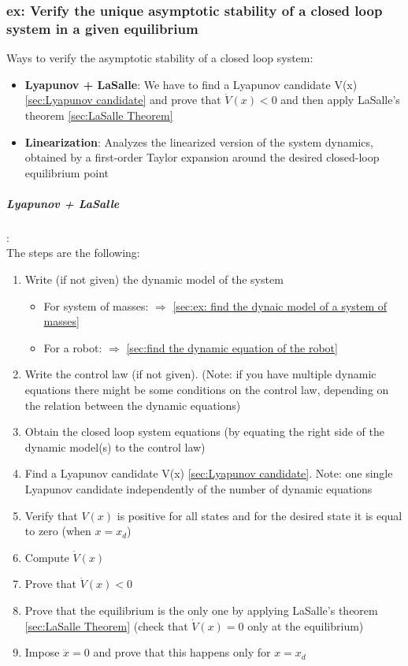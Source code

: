 \documentclass[a4paper,12pt]{article}
\begin{document}
\subsubsection{ex: Verify the unique asymptotic stability of a closed loop
system in a given equilibrium}
Ways to verify the asymptotic stability of a
closed loop system:
\begin{itemize}
    \item \textbf{Lyapunov + LaSalle}: We have to find a Lyapunov
    candidate V(x) \ref{sec:Lyapunov candidate} and prove that $\dot{V}(x) < 0$ and then apply
    LaSalle's theorem \ref{sec:LaSalle Theorem}
    \item \textbf{Linearization}: Analyzes the linearized version of the system
    dynamics, obtained by a first-order Taylor expansion around the desired closed-loop equilibrium
    point
\end{itemize}
\subparagraph{Lyapunov + LaSalle}:\\
\label{sub:Lyapunov + LaSalle}
The steps are the following:
\begin{enumerate}
    \item Write (if not given) the dynamic model of the system 
    \begin{itemize}
        \item For system of masses: $\Rightarrow$ \ref{sec:ex: find the dynaic model of a system of masses}
        \item For a robot: $\Rightarrow$ \ref{sec:find the dynamic equation of the robot}
    \end{itemize}
    \item Write the control law (if not given). (Note: if you have multiple
    dynamic equations there might be some conditions on the control law, depending
    on the relation between the dynamic equations)
    \item Obtain the closed loop system equations (by 
    equating the right side of the dynamic model(s) to the control law)
    \item Find a Lyapunov candidate V(x) \ref{sec:Lyapunov candidate}. 
    Note: one single Lyapunov candidate independently of 
    the number of dynamic equations
    \item Verify that $V(x)$ is positive for all states and for 
    the desired state it is equal to zero (when $x = x_d$)
    \item Compute $\dot{V}(x)$
    \item Prove that $\dot{V}(x) < 0$
    \item Prove that the equilibrium is the only one by applying
     LaSalle's theorem \ref{sec:LaSalle Theorem} (check that 
     $\dot{V}(x) = 0$ only at the equilibrium)
    \item Impose $\ddot{x}=0$ and prove that this happens only for 
    $x=x_d$
\end{enumerate}
\end{document}
